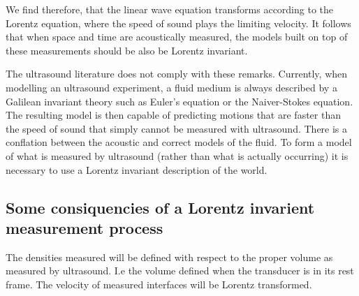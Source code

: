 We find therefore, that the linear wave equation transforms according to the Lorentz equation, where the speed of sound plays the limiting velocity.
It follows that when space and time are acoustically measured,
the models built on top of these measurements should be also be Lorentz invariant.

The ultrasound literature does not comply with these remarks.
Currently, when modelling an ultrasound experiment, a fluid medium is always described by a Galilean invariant theory such as Euler's equation or the Naiver-Stokes equation.
The resulting model is then capable of predicting motions that are faster than the speed of sound
that simply cannot be measured with ultrasound.
There is a conflation between the acoustic and correct models of the fluid.
To form a model of what is measured by ultrasound (rather than what is actually occurring)
it is necessary to use a Lorentz invariant description of the world.

\subsection{Some consiquencies of a Lorentz invarient measurement process}

The densities measured will be defined with respect to the proper volume as measured by ultrasound.
I.e the volume defined when the transducer is in its rest frame.
The velocity of measured interfaces will be Lorentz transformed.









